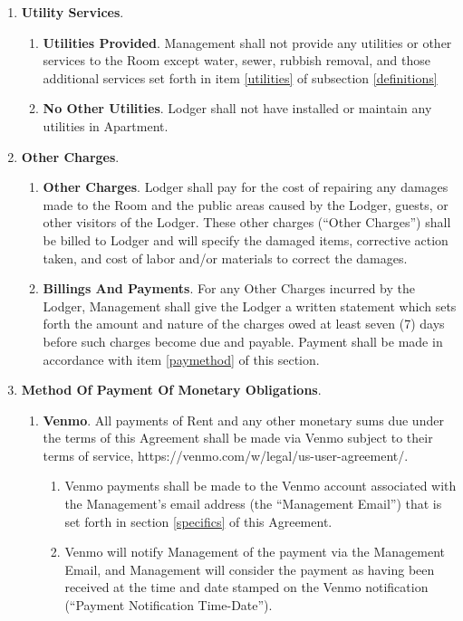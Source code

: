 \documentclass[12pt,letterpaper]{article}
\newcommand{\lodger}{Lodger}
\newcommand{\management}{Management}
\newcommand{\myemail}{Management Email}
\newcommand{\apt}{Apartment}
\newcommand{\room}{Room}
\newcommand{\paymenttime}{Payment Notification Time-Date}
\begin{document}
\begin{enumerate}
\begin{enumerate}
		\end{enumerate} 
	\item \textbf{Utility Services}. 
		\begin{enumerate} 
			\item \textbf{Utilities Provided}. \management{} shall not provide any utilities or other services to the \room{} except water, sewer, rubbish removal, and those additional services set forth in item \ref{utilities} of subsection \ref{definitions}
			\item \textbf{No Other Utilities}. \lodger{} shall not have installed or maintain any utilities in \apt{}.
		\end{enumerate} 
	\item \textbf{Other Charges}. 
		\begin{enumerate} 
			\item \textbf{Other Charges}. \lodger{} shall pay for the cost of repairing any damages made to the \room{} and the public areas caused by the \lodger{}, guests, or other visitors of the \lodger{}. These other charges (``Other Charges'') shall be billed to \lodger{} and will specify the damaged items, corrective action taken, and cost of labor and/or materials to correct the damages. 
			\item \textbf{Billings And Payments}. For any Other Charges incurred by the \lodger{}, \management{} shall give the \lodger{} a written statement which sets forth the amount and nature of the charges owed at least seven (7) days before such charges become due and payable. Payment shall be made in accordance with item \ref{paymethod} of this section. 
		\end{enumerate} 
	\item \textbf{Method Of Payment Of Monetary Obligations}. \label{paymethod}
		\begin{enumerate} 
			\item \textbf{Venmo}. All payments of Rent and any other monetary sums due under the terms of this Agreement shall be made via Venmo subject to their terms of service, https://venmo.com/w/legal/us-user-agreement/. 
				\begin{enumerate}
					\item Venmo payments shall be made to the Venmo account associated with the \management{}'s email address (the ``\myemail{}'') that is set forth in section \ref{specifics} of this Agreement{}. 
					\item \label{defpaytime} 
						Venmo will notify \management{} of the payment via the \myemail{}, and \management{} will consider the payment as having been received at the time and date stamped on the Venmo notification (``\paymenttime{}''). 

\end{enumerate}
\end{enumerate}
\end{enumerate}
\end{document}
